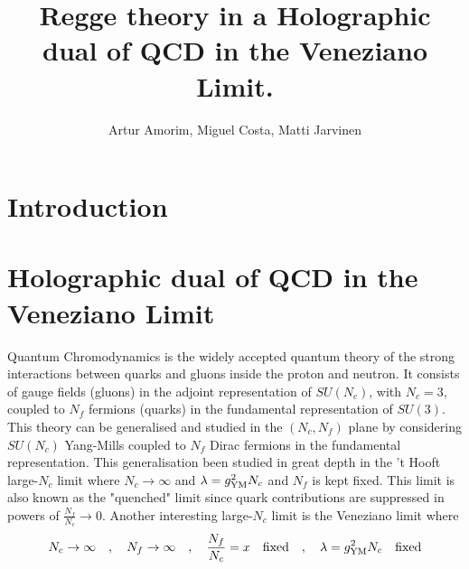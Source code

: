 \documentclass[a4paper,12pt]{article}
\title{Regge theory in a Holographic dual of QCD in the Veneziano Limit.}
\author{Artur Amorim, Miguel Costa, Matti Jarvinen}
\date{}
\begin{document}
\maketitle

\section{Introduction}

\section{Holographic dual of QCD in the Veneziano Limit}

Quantum Chromodynamics is the widely accepted quantum theory of the strong interactions between quarks and gluons inside the proton and neutron. It consists of gauge fields (gluons) in the adjoint representation of $SU(N_c)$, with $N_c = 3$, coupled to $N_f$ fermions (quarks) in the fundamental representation of $SU(3)$. This theory can be generalised and studied in the $(N_c, N_f)$ plane by considering $SU(N_c)$ Yang-Mills coupled to $N_f$ Dirac fermions in the fundamental representation. This generalisation been studied in great depth in the 't Hooft large-$N_c$ limit  where $N_c \rightarrow \infty$ and $\lambda = g_{\rm{YM}}^2 N_c$ and $N_f$ is kept fixed. This limit is also known as the "quenched" limit since quark contributions are suppressed in powers of $\frac{N_f}{N_c} \rightarrow 0$.
Another interesting large-$N_c$ limit is the Veneziano limit where
\begin{align}
N_c \rightarrow \infty \quad , \quad N_f \rightarrow \infty \quad , \quad \frac{N_f}{N_c} = x \quad {\rm fixed} \quad , \quad \lambda = g_{\rm{YM}}^2 N_c \quad {\rm fixed}
\end{align}
\end{document}
